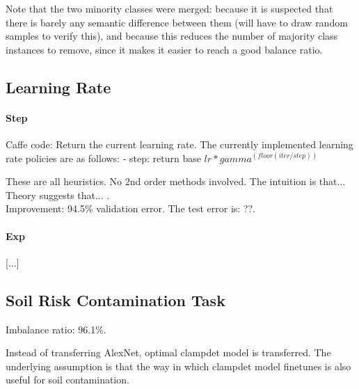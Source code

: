\documentclass[a4paper,11pt]{article}
\begin{document}
Note that the two minority classes were merged: because it is suspected that there is barely any semantic difference between them (will have to draw random samples to verify this), and because this reduces the number of majority class instances to remove, since it makes it easier to reach a good balance ratio. \\


\subsection{Learning Rate}

\paragraph{Step}

Caffe code:
 Return the current learning rate. The currently implemented learning rate
 policies are as follows:
    - step: return base $lr * gamma ^ (floor(iter / step))$
    

These are all heuristics. No 2nd order methods involved. The intuition is that... Theory suggests that... . \\

Improvement: 94.5\% validation error. The test error is: ??.\\

\paragraph{Exp}

[...] \\

\subsection{Soil Risk Contamination Task}

Imbalance ratio: 96.1\%.

Instead of transferring AlexNet, optimal clampdet model is transferred. The underlying assumption is that the way in which clampdet model finetunes is also useful for soil contamination. 
\end{document}
